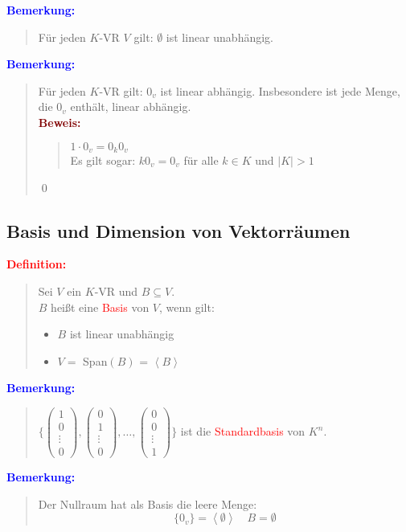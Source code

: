 \documentclass{article}
\newcommand{\red}[1]{\textcolor{red}{#1}}
\newcommand{\blue}[1]{\textcolor{blue}{#1}}
\newcommand{\maroon}[1]{\textcolor{maroon}{#1}}
\newcommand{\de}[1]{\red{\textbf{Definition: }}\begin{quote}#1\end{quote}}
\newcommand{\an}[1]{\blue{\textbf{Bemerkung: }}\begin{quote}#1\end{quote}}
\newcommand{\pr}[1]{\maroon{\textbf{Beweis: }}\begin{quote}#1\end{quote}\qed}
\newcommand{\spann}[1]{\left\langle#1\right\rangle}
\begin{document}
\an{
    Für jeden $K$-VR $V$ gilt: $\emptyset$ ist linear unabhängig.
}

\an{
    Für jeden $K$-VR gilt: $0_v$ ist linear abhängig. Insbesondere ist jede Menge, die $0_v$ enthält, linear abhängig.\\
    \pr{
        $1 \cdot 0_v = 0_k0_v$\\
        Es gilt sogar: $k0_v = 0_v$ für alle $k \in K$ und $|K| > 1$
        }
}

\subsection{Basis und Dimension von Vektorräumen}

\de{
    Sei $V$ ein $K$-VR und $B \subseteq V$.\\
    $B$ heißt eine \red{Basis} von $V$, wenn gilt:
    \begin{itemize}
        \item $B$ ist linear unabhängig
        \item $V =$ Span$(B)$ = $\spann{B}$
    \end{itemize}
}

\an{
    $\{
        \begin{pmatrix}
            1\\
            0\\
            \vdots\\
            0
        \end{pmatrix},
        \begin{pmatrix}
            0\\
            1\\
            \vdots\\
            0
        \end{pmatrix},
        \dots,
        \begin{pmatrix}
            0\\
            0\\
            \vdots\\
            1
        \end{pmatrix}
    \}$ ist die \red{Standardbasis} von $K^n$.
}

\an{
    Der Nullraum hat als Basis die leere Menge:
    \[
        \{0_v\} = \spann{\emptyset} \quad B = \emptyset    
    \]
}
\end{document}
